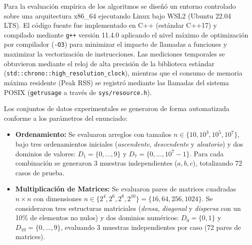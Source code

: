 Para la evaluación empírica de los algoritmos se diseñó un entorno controlado sobre una arquitectura x86\_64 ejecutando Linux bajo WSL2 (Ubuntu 22.04 LTS). El código fuente fue implementado en C++ (estándar C++17) y compilado mediante \texttt{g++} versión 11.4.0 aplicando el nivel máximo de optimización por compilador (\texttt{-O3}) para minimizar el impacto de llamadas a funciones y maximizar la vectorización de instrucciones. Las mediciones temporales se obtuvieron mediante el reloj de alta precisión de la biblioteca estándar (\texttt{std::chrono::high\_resolution\_clock}), mientras que el consumo de memoria máxima residente (Peak RSS) se registró mediante las llamadas del sistema POSIX (\texttt{getrusage} a través de \texttt{sys/resource.h}).

Los conjuntos de datos experimentales se generaron de forma automatizada conforme a los parámetros del enunciado:
\begin{itemize}
    \item \textbf{Ordenamiento:} Se evaluaron arreglos con tamaños $n \in \{10, 10^3, 10^5, 10^7\}$, bajo tres ordenamientos iniciales (\textit{ascendente}, \textit{descendente} y \textit{aleatorio}) y dos dominios de valores: $D_1 = \{0, \dots, 9\}$ y $D_7 = \{0, \dots, 10^7 - 1\}$. Para cada combinación se generaron 3 muestras independientes ($a, b, c$), totalizando 72 casos de prueba.
    \item \textbf{Multiplicación de Matrices:} Se evaluaron pares de matrices cuadradas $n \times n$ con dimensiones $n \in \{2^4, 2^6, 2^8, 2^{10}\} = \{16, 64, 256, 1024\}$. Se consideraron tres estructuras matriciales (\textit{densa}, \textit{diagonal} y \textit{dispersa} con un 10\% de elementos no nulos) y dos dominios numéricos: $D_0 = \{0, 1\}$ y $D_{10} = \{0, \dots, 9\}$, evaluando 3 muestras independientes por caso (72 pares de matrices).
\end{itemize}